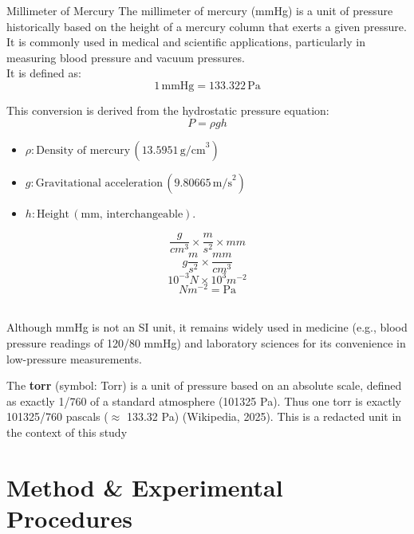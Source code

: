 \documentclass{article}
\begin{document}
\begin{briefillus}{Millimeter of Mercury}{}
	The millimeter of mercury (mmHg) is a unit of pressure historically based on the height of a mercury column that exerts a given pressure. It is commonly used in medical and scientific applications, particularly in measuring blood pressure and vacuum pressures.\\[8pt]
	It is defined as:
	\[1\,\text{mmHg} = 133.322\,\text{Pa}\]
	\begin{minipage}{0.9\textwidth}		
		This conversion is derived from the hydrostatic pressure equation:\\
		\[P = \rho g h\]
		\begin{itemize}[itemsep=-1mm]
			\item \(\rho : \text{Density of mercury}\, (13.5951 \, \text{g/cm}^3)\)
			\item \(g : \text{Gravitational acceleration}\, (9.80665 \, \text{m/s}^2)\)
			\item \(h : \text{Height}\, (\text{mm},\, \text{interchangeable})\).	
		\end{itemize}
	\end{minipage}\hspace{-7em}
	\begin{minipage}{0.2\textwidth}\vspace{-2em}
		$$\frac{g}{cm^3} \times \frac{m}{s^2} \times mm$$
		$$g\frac{m}{s^2} \times\frac{mm}{cm^3}$$
		$$10^{-3}N \times10^{3}m^{-2}$$
		$$N m^{-2} = \text{Pa}$$
	\end{minipage}\\[8pt]
	Although mmHg is not an SI unit, it remains widely used in medicine (e.g., blood pressure readings of 120/80 mmHg) and laboratory sciences for its convenience in low-pressure measurements.
\end{briefillus}		\vspace*{\fill}\noindent\footnotesize{The \textbf{torr} (symbol: Torr) is a unit of pressure based on an absolute scale, defined as exactly 1/760 of a standard atmosphere (101325 Pa). Thus one torr is exactly 101325/760 pascals ($\approx$ 133.32 Pa) (Wikipedia, 2025). This is a redacted unit in the context of this study}
\tikzexternalenable

	
	\newpage\vspace*{-20pt}\large
	\section{Method \& Experimental Procedures}\label{Method_Experimental_Procedures}
\end{document}
